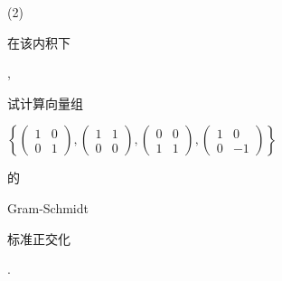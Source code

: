 \documentclass[10pt]{article}
\begin{document}
(2) \begin{CJK}{UTF8}{mj}在该内积下\end{CJK}, \begin{CJK}{UTF8}{mj}试计算向量组\end{CJK} $\left\{\left(\begin{array}{ll}1 & 0 \\ 0 & 1\end{array}\right),\left(\begin{array}{cc}1 & 1 \\ 0 & 0\end{array}\right),\left(\begin{array}{cc}0 & 0 \\ 1 & 1\end{array}\right),\left(\begin{array}{cc}1 & 0 \\ 0 & -1\end{array}\right)\right\}$ \begin{CJK}{UTF8}{mj}的\end{CJK} Gram-Schmidt \begin{CJK}{UTF8}{mj}标准正交化\end{CJK}.
\end{document}
